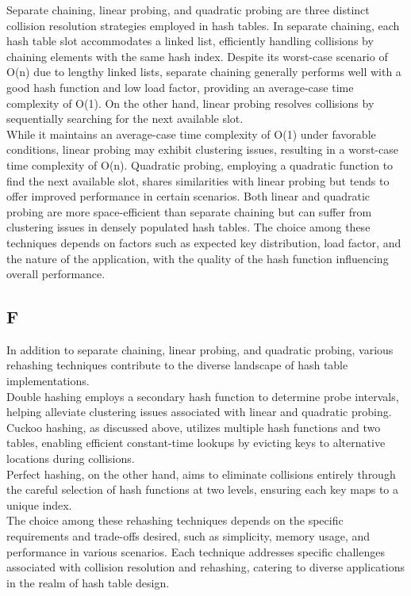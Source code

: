 \documentclass{article}
\begin{document}
Separate chaining, linear probing, and quadratic probing are three distinct collision resolution strategies employed in hash tables. In separate chaining, each hash table slot accommodates a linked list, efficiently handling collisions by chaining elements with the same hash index. Despite its worst-case scenario of O(n) due to lengthy linked lists, separate chaining generally performs well with a good hash function and low load factor, providing an average-case time complexity of O(1). On the other hand, linear probing resolves collisions by sequentially searching for the next available slot. \\
While it maintains an average-case time complexity of O(1) under favorable conditions, linear probing may exhibit clustering issues, resulting in a worst-case time complexity of O(n). Quadratic probing, employing a quadratic function to find the next available slot, shares similarities with linear probing but tends to offer improved performance in certain scenarios. Both linear and quadratic probing are more space-efficient than separate chaining but can suffer from clustering issues in densely populated hash tables. The choice among these techniques depends on factors such as expected key distribution, load factor, and the nature of the application, with the quality of the hash function influencing overall performance.

\subsection{F}

In addition to separate chaining, linear probing, and quadratic probing, various rehashing techniques contribute to the diverse landscape of hash table implementations. \\
Double hashing employs a secondary hash function to determine probe intervals, helping alleviate clustering issues associated with linear and quadratic probing. \\
Cuckoo hashing, as discussed above, utilizes multiple hash functions and two tables, enabling efficient constant-time lookups by evicting keys to alternative locations during collisions. \\
Perfect hashing, on the other hand, aims to eliminate collisions entirely through the careful selection of hash functions at two levels, ensuring each key maps to a unique index. \\
The choice among these rehashing techniques depends on the specific requirements and trade-offs desired, such as simplicity, memory usage, and performance in various scenarios. Each technique addresses specific challenges associated with collision resolution and rehashing, catering to diverse applications in the realm of hash table design.
\end{document}
